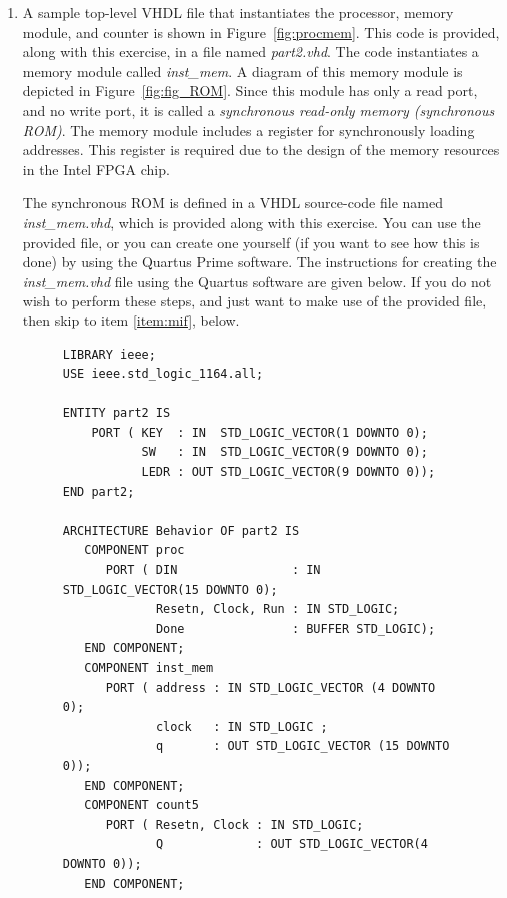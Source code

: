 \documentclass[epsfig,10pt,fullpage]{article} \addtolength{\textwidth}{1.5in}
\begin{document}
\begin{enumerate}

\item A sample top-level VHDL file that instantiates the processor, memory module, and
counter is shown in Figure~\ref{fig:procmem}. This code is provided, along with this exercise,
in a file named {\it part2.vhd}.  The code instantiates a memory module called {\it inst\_mem}. 
A diagram of this memory module is depicted in Figure~\ref{fig:fig_ROM}.
Since this module has only a read port, and no write port, it is called a {\it synchronous 
read-only memory (synchronous ROM)}. The memory module includes a register for 
synchronously loading addresses. This register is required due to the design of the memory 
resources in the Intel FPGA chip. 

The synchronous ROM is defined in a VHDL source-code file named 
{\it inst\_mem.vhd}, which is provided
along with this exercise. You can use the provided file, or you can create one yourself 
(if you want to see how this is done) by using the Quartus Prime software. The instructions for 
creating the {\it inst\_mem.vhd} file using the Quartus software are given below. If you do 
not wish to perform these steps, and just want to make use of the provided file, then 
skip to item \ref{item:mif}, below.
                
\lstset{language=VHDL,numbers=none,escapechar=|}
\begin{figure}[H]
\begin{center}
\begin{minipage}[]{15 cm}
\begin{lstlisting}[name=proc]
LIBRARY ieee;
USE ieee.std_logic_1164.all;

ENTITY part2 IS 
    PORT ( KEY  : IN  STD_LOGIC_VECTOR(1 DOWNTO 0);
           SW   : IN  STD_LOGIC_VECTOR(9 DOWNTO 0);
           LEDR : OUT STD_LOGIC_VECTOR(9 DOWNTO 0));
END part2;

ARCHITECTURE Behavior OF part2 IS
   COMPONENT proc
      PORT ( DIN                : IN STD_LOGIC_VECTOR(15 DOWNTO 0);
             Resetn, Clock, Run : IN STD_LOGIC;
             Done               : BUFFER STD_LOGIC);
   END COMPONENT;
   COMPONENT inst_mem 
      PORT ( address : IN STD_LOGIC_VECTOR (4 DOWNTO 0);
             clock   : IN STD_LOGIC ;
             q       : OUT STD_LOGIC_VECTOR (15 DOWNTO 0));
   END COMPONENT;
   COMPONENT count5
      PORT ( Resetn, Clock : IN STD_LOGIC;
             Q             : OUT STD_LOGIC_VECTOR(4 DOWNTO 0));
   END COMPONENT;


\end{lstlisting}
\end{minipage}
\end{center}
\end{figure}
\end{enumerate}
\end{document}

